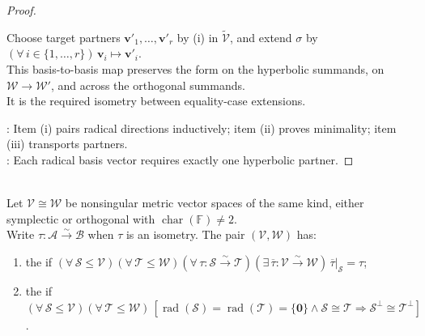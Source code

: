 \begin{theorem}
\begin{proof}
\begin{enumerate}[label=(\roman*)]
Choose target partners $\mathbf{v}'_1,\ldots,\mathbf{v}'_r$ by (i) in $\widetilde{\mathcal{V}}$, and extend $\sigma$ by $(\forall\,i\in\{1,\ldots,r\})\,\mathbf{v}_i\mapsto\mathbf{v}'_i$.\\
This basis-to-basis map preserves the form on the hyperbolic summands, on $\mathcal{W}\to\mathcal{W}'$, and across the orthogonal summands.\\
It is the required isometry between equality-case extensions.
\end{enumerate}
: Item (i) pairs radical directions inductively; item (ii) proves minimality; item (iii) transports partners.\\
: Each radical basis vector requires exactly one hyperbolic partner.
\end{proof}
\end{theorem}

\begin{definition} \label{def:witt-extension-cancellation-properties} \\
Let $\mathcal{V}\cong\mathcal{W}$ be nonsingular metric vector spaces of the same kind, either symplectic or orthogonal with $\operatorname{char}(\mathbb{F})\neq2$.\\
Write $\tau:\mathcal{A}\xrightarrow{\sim}\mathcal{B}$ when $\tau$ is an isometry. The pair $(\mathcal{V},\mathcal{W})$ has:
\begin{enumerate}[label=(\roman*)]
\setlength{\itemsep}{0pt}
\item the  if $(\forall\,\mathcal{S}\leq\mathcal{V})(\forall\,\mathcal{T}\leq\mathcal{W})(\forall\,\tau:\mathcal{S}\xrightarrow{\sim}\mathcal{T})(\exists\,\overline{\tau}:\mathcal{V}\xrightarrow{\sim}\mathcal{W})\,\overline{\tau}|_{\mathcal{S}}=\tau$;
\item the  if $(\forall\,\mathcal{S}\leq\mathcal{V})(\forall\,\mathcal{T}\leq\mathcal{W})\,[\operatorname{rad}(\mathcal{S})=\operatorname{rad}(\mathcal{T})=\{\mathbf{0}\}\wedge\mathcal{S}\cong\mathcal{T}\Longrightarrow\mathcal{S}^{\perp}\cong\mathcal{T}^{\perp}]$.
\end{enumerate}
\end{definition}

